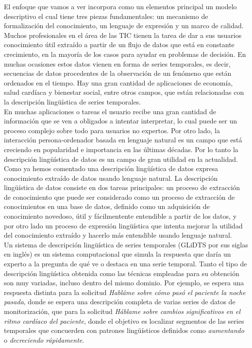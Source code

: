 \documentclass[10pt,a4paper]{article}
\begin{document}
El enfoque que vamos a ver incorpora como un elementos principal un modelo descriptivo el cual tiene tres piezas fundamentales: un mecanismo de formalización del conocimiento, un lenguaje de expresión y un marco de calidad.\\

Muchos profesionales en el área de las TIC tienen la tarea de dar a sus usuarios conocimiento útil extraído a partir de un flujo de datos que está en constante crecimiento, en la mayoría de los casos para ayudar en problemas de decisión. En muchas ocasiones estos datos vienen en forma de series temporales, es decir, secuencias de datos procedentes de la observación de un fenómeno que están ordenados en el tiempo. Hay una gran cantidad de aplicaciones de economía, salud cardíaca y bienestar social, entre otros campos, que están relacionadas con la descripción lingüística de series temporales.\\

En muchas aplicaciones o tareas el usuario recibe una gran cantidad de información que se ven a obligados a intentar interpretar, lo cual puede ser un proceso complejo sobre todo para usuarios no expertos. Por otro lado, la interacción persona-ordenador basada en lenguaje natural es un campo que está creciendo en popularidad e importancia en las últimas décadas. Por lo tanto la descripción lingüística de datos es un campo de gran utilidad en la actualidad.\\

Como ya hemos comentado una descripción lingüística de datos expresa conocimiento extraído de datos usando lenguaje natural. La descripción lingüística de datos consiste en dos tareas principales: un proceso de extracción de conocimiento que puede ser considerado como un proceso de extracción de conocimientos en una base de datos, definido como un adquisición de conocimiento novedoso, útil y fácilmentente entendible a partir de los datos, y por otro lado un proceso de expresión lingüística que intenta mejorar la utilidad del conocimiento extraído y hacerlo más entendible usando lenguaje natural.\\
 
Un sistema de descripción lingüística de series temporales (GLiDTS por sus siglas en inglés) es un sistema computacional que simula la respuesta que daría un experto a la pregunta de qué ve o destaca en una serie temporal. Tanto el tipo de descripción lingüística obtenida como las técnicas empleadas para su obtención son muy variadas, incluso dentro del mismo dominio. Por ejemplo, se espera una respuesta distinta para la solicitud \textit{Habláme sobre cómo pasó el paciente la noche pasada}, donde se espera una descripción completa de varias series de datos de monitorización, que para la solicitud \textit{Háblame sobre cambios significativos en el ritmo cardíaco del paciente}, donde el objetivo es localizar segmentos de las series temporales que concuerden con patrones lingüísticos definidos como \textit{aumentando} o \textit{decreciendo rápidamente}.\\
\end{document}
